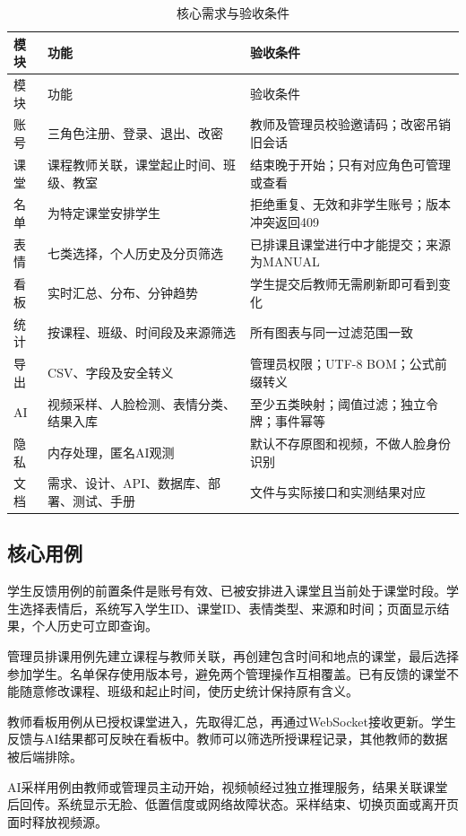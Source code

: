 \documentclass[UTF8,a4paper,zihao=-4,fontset=fandol]{ctexart}
\begin{document}
\begin{longtable}{p{2cm}p{5.9cm}p{6.25cm}}
\caption{核心需求与验收条件}\label{tab:req}\\
\toprule 模块 & 功能 & 验收条件\\\midrule\endfirsthead
\toprule 模块 & 功能 & 验收条件\\\midrule\endhead
账号 & 三角色注册、登录、退出、改密 & 教师及管理员校验邀请码；改密吊销旧会话\\
课堂 & 课程教师关联，课堂起止时间、班级、教室 & 结束晚于开始；只有对应角色可管理或查看\\
名单 & 为特定课堂安排学生 & 拒绝重复、无效和非学生账号；版本冲突返回409\\
表情 & 七类选择，个人历史及分页筛选 & 已排课且课堂进行中才能提交；来源为MANUAL\\
看板 & 实时汇总、分布、分钟趋势 & 学生提交后教师无需刷新即可看到变化\\
统计 & 按课程、班级、时间段及来源筛选 & 所有图表与同一过滤范围一致\\
导出 & CSV、字段及安全转义 & 管理员权限；UTF-8 BOM；公式前缀转义\\
AI & 视频采样、人脸检测、表情分类、结果入库 & 至少五类映射；阈值过滤；独立令牌；事件幂等\\
隐私 & 内存处理，匿名AI观测 & 默认不存原图和视频，不做人脸身份识别\\
文档 & 需求、设计、API、数据库、部署、测试、手册 & 文件与实际接口和实测结果对应\\
\bottomrule\end{longtable}

\subsection{核心用例}

学生反馈用例的前置条件是账号有效、已被安排进入课堂且当前处于课堂时段。学生选择表情后，系统写入学生ID、课堂ID、表情类型、来源和时间；页面显示结果，个人历史可立即查询。

管理员排课用例先建立课程与教师关联，再创建包含时间和地点的课堂，最后选择参加学生。名单保存使用版本号，避免两个管理操作互相覆盖。已有反馈的课堂不能随意修改课程、班级和起止时间，使历史统计保持原有含义。

教师看板用例从已授权课堂进入，先取得汇总，再通过WebSocket接收更新。学生反馈与AI结果都可反映在看板中。教师可以筛选所授课程记录，其他教师的数据被后端排除。

AI采样用例由教师或管理员主动开始，视频帧经过独立推理服务，结果关联课堂后回传。系统显示无脸、低置信度或网络故障状态。采样结束、切换页面或离开页面时释放视频源。
\end{document}
